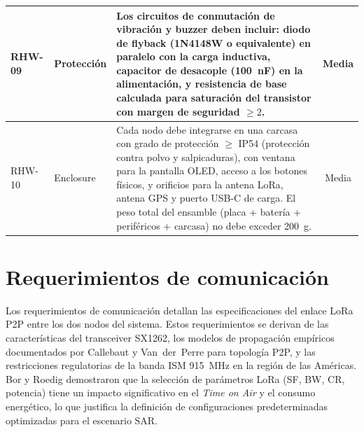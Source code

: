 \begin{table}[H]
\begin{center}
{\begin{tabular}{| l | l | p{8.5cm} | c |}
\hline
RHW-09 & Protección & Los circuitos de conmutación de vibración y buzzer deben incluir: diodo de flyback (1N4148W o equivalente) en paralelo con la carga inductiva, capacitor de desacople (100~nF) en la alimentación, y resistencia de base calculada para saturación del transistor con margen de seguridad $\geq 2$. & Media \\
\hline
RHW-10 & Enclosure & Cada nodo debe integrarse en una carcasa con grado de protección $\geq$ IP54 (protección contra polvo y salpicaduras), con ventana para la pantalla OLED, acceso a los botones físicos, y orificios para la antena LoRa, antena GPS y puerto USB-C de carga. El peso total del ensamble (placa + batería + periféricos + carcasa) no debe exceder 200~g. & Media \\
\hline

\end{tabular}}
\label{tab:req_hardware}
\end{center}
\end{table}


\section{Requerimientos de comunicación}\label{sec:req_comunicacion}


Los requerimientos de comunicación detallan las especificaciones del enlace LoRa P2P entre los dos nodos del sistema. Estos requerimientos se derivan de las características del transceiver SX1262, los modelos de propagación empíricos documentados por Callebaut y Van~der~Perre \cite{callebaut2020p2p} para topología P2P, y las restricciones regulatorias de la banda ISM 915~MHz en la región de las Américas. Bor y Roedig \cite{bor2017parameter} demostraron que la selección de parámetros LoRa (SF, BW, CR, potencia) tiene un impacto significativo en el \textit{Time on Air} y el consumo energético, lo que justifica la definición de configuraciones predeterminadas optimizadas para el escenario SAR.

